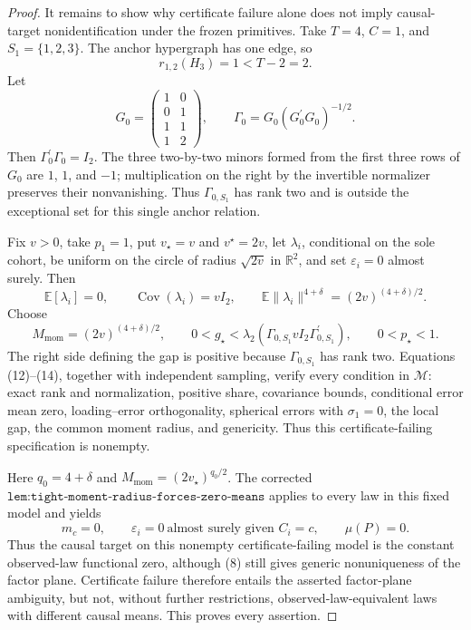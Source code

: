\documentclass{article}
\begin{document}
\begin{proof}
It remains to show why certificate failure alone does not imply causal-target nonidentification under the frozen primitives. Take \(T=4\), \(C=1\), and \(S_1=\{1,2,3\}\). The anchor hypergraph has one edge, so
\[
r_{1,2}(H_3)=1<T-2=2.
\tag{11}
\]
Let
\[
G_0=
\begin{pmatrix}
1&0\\
0&1\\
1&1\\
1&2
\end{pmatrix},
\qquad
\Gamma_0=G_0(G_0^{\prime}G_0)^{-1/2}.
\tag{12}
\]
Then \(\Gamma_0^{\prime}\Gamma_0=I_2\). The three two-by-two minors formed from the first three rows of \(G_0\) are \(1\), \(1\), and \(-1\); multiplication on the right by the invertible normalizer preserves their nonvanishing. Thus \(\Gamma_{0,S_1}\) has rank two and is outside the exceptional set for this single anchor relation.

Fix \(v>0\), take \(p_1=1\), put \(v_\star=v\) and \(v^{\star}=2v\), let \(\lambda_i\), conditional on the sole cohort, be uniform on the circle of radius \(\sqrt{2v}\) in \(\mathbb R^2\), and set \(\varepsilon_i=0\) almost surely. Then
\[
\mathbb E[\lambda_i]=0,
\qquad
\operatorname{Cov}(\lambda_i)=vI_2,
\qquad
\mathbb E\|\lambda_i\|^{4+\delta}=(2v)^{(4+\delta)/2}.
\tag{13}
\]
Choose
\[
M_{\mathrm{mom}}=(2v)^{(4+\delta)/2},
\qquad
0<g_\star<\lambda_2(\Gamma_{0,S_1}vI_2\Gamma_{0,S_1}^{\prime}),
\qquad
0<p_\star<1.
\tag{14}
\]
The right side defining the gap is positive because \(\Gamma_{0,S_1}\) has rank two. Equations (12)--(14), together with independent sampling, verify every condition in \(\mathcal M\): exact rank and normalization, positive share, covariance bounds, conditional error mean zero, loading--error orthogonality, spherical errors with \(\sigma_1=0\), the local gap, the common moment radius, and genericity. Thus this certificate-failing specification is nonempty.

Here \(q_0=4+\delta\) and \(M_{\mathrm{mom}}=(2v_\star)^{q_0/2}\). The corrected \(\texttt{lem:tight-moment-radius-forces-zero-means}\) applies to every law in this fixed model and yields
\[
m_c=0,
\qquad
\varepsilon_i=0\ \text{almost surely given }C_i=c,
\qquad
\mu(P)=0.
\tag{15}
\]
Thus the causal target on this nonempty certificate-failing model is the constant observed-law functional zero, although (8) still gives generic nonuniqueness of the factor plane. Certificate failure therefore entails the asserted factor-plane ambiguity, but not, without further restrictions, observed-law-equivalent laws with different causal means. This proves every assertion.
\end{proof}
\end{document}
